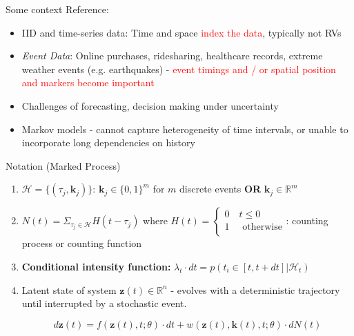 \documentclass{beamer}
\begin{document}
\begin{frame}{Some context}
    Reference: \cite{Nan2016}

    \begin{itemize}
        \item IID and time-series data: Time and space \textcolor{red}{index the data}, typically not RVs

        \item \emph{Event Data}: Online purchases, ridesharing, healthcare records, extreme weather events (e.g. earthquakes) - \textcolor{red}{event timings and / or spatial position and markers become important}

        \item Challenges of forecasting, decision making under uncertainty

        \item Markov models - cannot capture heterogeneity of time intervals, or unable to incorporate long dependencies on history
    \end{itemize}
\end{frame}

\begin{frame}{Notation (Marked Process)}
    \begin{enumerate}
        \item $\mathcal{H} = \{(\tau_j, \mathbf{k}_j)\}$: $\mathbf{k}_j \in \{0, 1\}^m$ for $m$ discrete events \textbf{OR} $\mathbf{k}_j \in \mathbb{R}^m$
        \item $N(t) = \Sigma_{\tau_j \in \mathcal{H}} H(t - \tau_j)$ where $H(t) = \begin{cases}
               0 \quad t \leq 0\\
               1 \quad \text{ otherwise}\\
            \end{cases}$: counting process or counting function

        \item \textbf{Conditional intensity function:} $\lambda_t \cdot dt = p(t_i \in [t, t + dt] | \mathcal{H}_t)$

        \item Latent state of system $\mathbf{z}(t) \in \mathbb{R}^n$ - evolves with a deterministic trajectory until interrupted by a stochastic event.

        $$d\mathbf{z}(t) = f(\mathbf{z}(t), t; \theta) \cdot dt + w (\mathbf{z}(t), \mathbf{k}(t), t; \theta) \cdot dN(t)$$
    \end{enumerate}
\end{frame}
\end{document}
